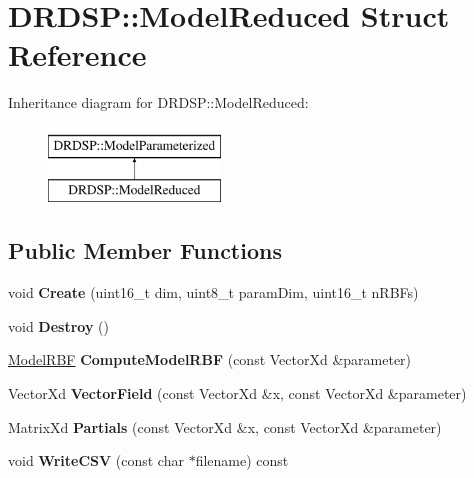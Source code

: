 \hypertarget{struct_d_r_d_s_p_1_1_model_reduced}{\section{D\-R\-D\-S\-P\-:\-:Model\-Reduced Struct Reference}
\label{struct_d_r_d_s_p_1_1_model_reduced}
}
Inheritance diagram for D\-R\-D\-S\-P\-:\-:Model\-Reduced\-:\begin{figure}[H]
\begin{center}
\leavevmode
\includegraphics[height=2.000000cm]{struct_d_r_d_s_p_1_1_model_reduced}
\end{center}
\end{figure}
\subsection*{Public Member Functions}
\begin{DoxyCompactItemize}
\item 
\hypertarget{struct_d_r_d_s_p_1_1_model_reduced_a630dfd8ee437ac00762db55a59fd8e05}{void {\bfseries Create} (uint16\-\_\-t dim, uint8\-\_\-t param\-Dim, uint16\-\_\-t n\-R\-B\-Fs)}\label{struct_d_r_d_s_p_1_1_model_reduced_a630dfd8ee437ac00762db55a59fd8e05}

\item 
\hypertarget{struct_d_r_d_s_p_1_1_model_reduced_a0cf3cf3e2dc9b7e9f905387bdd5ee941}{void {\bfseries Destroy} ()}\label{struct_d_r_d_s_p_1_1_model_reduced_a0cf3cf3e2dc9b7e9f905387bdd5ee941}

\item 
\hypertarget{struct_d_r_d_s_p_1_1_model_reduced_accd8ad44819268f2d49aeb426b4439c2}{\hyperlink{struct_d_r_d_s_p_1_1_model_r_b_f}{Model\-R\-B\-F} {\bfseries Compute\-Model\-R\-B\-F} (const Vector\-Xd \&parameter)}\label{struct_d_r_d_s_p_1_1_model_reduced_accd8ad44819268f2d49aeb426b4439c2}

\item 
\hypertarget{struct_d_r_d_s_p_1_1_model_reduced_a3e4dde2aa65d53f6033c0248bafab699}{Vector\-Xd {\bfseries Vector\-Field} (const Vector\-Xd \&x, const Vector\-Xd \&parameter)}\label{struct_d_r_d_s_p_1_1_model_reduced_a3e4dde2aa65d53f6033c0248bafab699}

\item 
\hypertarget{struct_d_r_d_s_p_1_1_model_reduced_a3ae282852370f25a33b346beb3ba2751}{Matrix\-Xd {\bfseries Partials} (const Vector\-Xd \&x, const Vector\-Xd \&parameter)}\label{struct_d_r_d_s_p_1_1_model_reduced_a3ae282852370f25a33b346beb3ba2751}

\item 
\hypertarget{struct_d_r_d_s_p_1_1_model_reduced_a3da2cd9ed93e71e44c00718e49ec4d2a}{void {\bfseries Write\-C\-S\-V} (const char $\ast$filename) const }\label{struct_d_r_d_s_p_1_1_model_reduced_a3da2cd9ed93e71e44c00718e49ec4d2a}

\end{DoxyCompactItemize}
